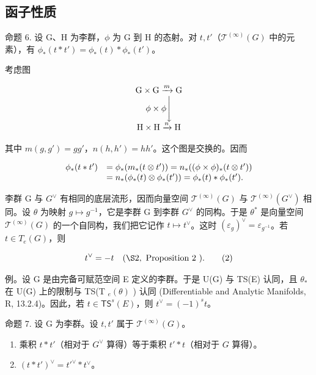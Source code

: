 \subsection{函子性质}

命题 6. 设 G、H 为李群，\(\phi\) 为 G 到 H 的态射。对 \(t, t'\)（\(\mathcal{T}^{(\infty)}(G)\) 中的元素），有 \(\phi_{*}(t * t') = \phi_{*}(t) * \phi_{*}(t')\)。

考虑图

\[
\begin{array}{c} \mathrm{G} \times \mathrm{G} \xrightarrow {m} \mathrm{G} \\ \phi \times \phi \Biggl \downarrow \\ \mathrm{H} \times \mathrm{H} \xrightarrow {n} \mathrm{H} \end{array}
\]

其中 \(m(g, g') = gg'\)，\(n(h, h') = hh'\)。这个图是交换的。因而

\[
\begin{array}{r l} \phi_ {*} (t * t ^ {\prime}) & = \phi_ {*} (m _ {*} (t \otimes t ^ {\prime})) = n _ {*} ((\phi \times \phi) _ {*} (t \otimes t ^ {\prime})) \\ & = n _ {*} (\phi_ {*} (t) \otimes \phi_ {*} (t ^ {\prime})) = \phi_ {*} (t) * \phi_ {*} (t ^ {\prime}). \end{array}
\]

李群 G 与 \(G^{\vee}\) 有相同的底层流形，因而向量空间 \(\mathcal{T}^{(\infty)}(G)\) 与 \(\mathcal{T}^{(\infty)}(G^{\vee})\) 相同。设 \(\theta\) 为映射 \(g \mapsto g^{-1}\)，它是李群 G 到李群 \(G^{\vee}\) 的同构。于是 \(\theta^{*}\) 是向量空间 \(\mathcal{T}^{(\infty)}(G)\) 的一个自同构，我们把它记作 \(t \mapsto t^{\vee}\)。这时 \((\varepsilon_{g})^{\vee} = \varepsilon_{g^{-1}}\)。若 \(t \in T_{e}(G)\)，则

\[
t ^ {\vee} = - t \quad (\S 2, \text { Proposition   2 }).\tag{2}
\]

例。设 G 是由完备可赋范空间 E 定义的李群。于是 U(G) 与 TS(E) 认同，且 \(\theta_{*}\) 在 U(G) 上的限制与 TS(T \(_{e}(\theta)\) ) 认同 (Differentiable and Analytic Manifolds, R, 13.2.4)。因此，若 \(t \in \mathsf{TS}^{s}(E)\)，则 \(t^{\vee} = (-1)^{s}t\)。

命题 7. 设 G 为李群。设 \(t, t'\) 属于 \(\mathcal{T}^{(\infty)}(G)\)。

\begin{enumerate}
\def\labelenumi{(\roman{enumi})}
\item
  乘积 \(t * t'\)（相对于 \(G^{\vee}\) 算得）等于乘积 \(t' * t\)（相对于 \(G\) 算得）。
\item
  \((t*t')^{\vee}=t'^{\vee}*t^{\vee}\)。
\end{enumerate}

